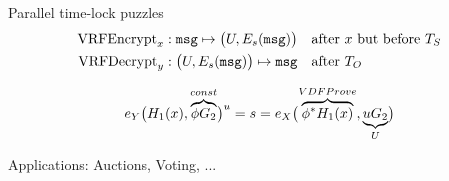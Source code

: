 \documentclass[fleqn,xcolor={usenames,dvipsnames},notes,aspectratio=169]{beamer} %
\begin{document}
\begin{frame}[t]{Parallel time-lock puzzles}
\vspace{-20pt}
\begin{align*}
\mathrm{VRFEncrypt}_x &: \mathtt{msg} \mapsto \bigl( U,E_s(\mathtt{msg}) \bigr) 
\quad\textrm{after $x$ but before $T_S$} \\
\mathrm{VRFDecrypt}_y &: \bigl( U,E_s(\mathtt{msg}) \bigr) \mapsto \mathtt{msg}
\quad\textrm{after $T_O$}
\end{align*}



$$
 e_Y \bigl( H_1(x), \overbrace{\phi G_2}^{const} \bigr)^u 
= s =
 e_X \bigl( \overbrace{\phi^* H_1(x)}^{VDFProve}, \underbrace{u G_2}_{U} \bigr) 
$$ 

\bigskip
\bigskip

Applications:  Auctions, Voting, ...

\end{frame}
\end{document}
